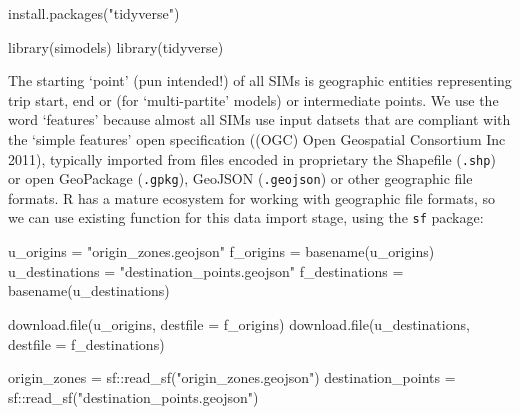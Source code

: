 \documentclass[11pt,letterpaper]{article}
\newenvironment{Shaded}{\begin{snugshade}}{\end{snugshade}}
\newcommand{\AttributeTok}[1]{\textcolor[rgb]{0.77,0.63,0.00}{#1}}
\newcommand{\FunctionTok}[1]{\textcolor[rgb]{0.00,0.00,0.00}{#1}}
\newcommand{\NormalTok}[1]{#1}
\newcommand{\OtherTok}[1]{\textcolor[rgb]{0.56,0.35,0.01}{#1}}
\newcommand{\SpecialCharTok}[1]{\textcolor[rgb]{0.00,0.00,0.00}{#1}}
\newcommand{\StringTok}[1]{\textcolor[rgb]{0.31,0.60,0.02}{#1}}
\begin{document}
\begin{Shaded}
\begin{Highlighting}[]
\FunctionTok{install.packages}\NormalTok{(}\StringTok{"tidyverse"}\NormalTok{)}
\end{Highlighting}
\end{Shaded}

\begin{Shaded}
\begin{Highlighting}[]
\FunctionTok{library}\NormalTok{(simodels)}
\FunctionTok{library}\NormalTok{(tidyverse)}
\end{Highlighting}
\end{Shaded}

The starting `point' (pun intended!) of all SIMs is geographic entities representing trip start, end or (for `multi-partite' models) or intermediate points.
We use the word `features' because almost all SIMs use input datsets that are compliant with the `simple features' open specification ((OGC) Open Geospatial Consortium Inc 2011), typically imported from files encoded in proprietary the Shapefile (\texttt{.shp}) or open GeoPackage (\texttt{.gpkg}), GeoJSON (\texttt{.geojson}) or other geographic file formats.
R has a mature ecosystem for working with geographic file formats, so we can use existing function for this data import stage, using the \texttt{sf} package:

\begin{Shaded}
\begin{Highlighting}[]
\NormalTok{u\_origins }\OtherTok{=} \StringTok{"origin\_zones.geojson"}
\NormalTok{f\_origins }\OtherTok{=} \FunctionTok{basename}\NormalTok{(u\_origins)}
\NormalTok{u\_destinations }\OtherTok{=} \StringTok{"destination\_points.geojson"}
\NormalTok{f\_destinations }\OtherTok{=} \FunctionTok{basename}\NormalTok{(u\_destinations)}
\end{Highlighting}
\end{Shaded}

\begin{Shaded}
\begin{Highlighting}[]
\FunctionTok{download.file}\NormalTok{(u\_origins, }\AttributeTok{destfile =}\NormalTok{ f\_origins)}
\FunctionTok{download.file}\NormalTok{(u\_destinations, }\AttributeTok{destfile =}\NormalTok{ f\_destinations)}
\end{Highlighting}
\end{Shaded}

\begin{Shaded}
\begin{Highlighting}[]
\NormalTok{origin\_zones }\OtherTok{=}\NormalTok{ sf}\SpecialCharTok{::}\FunctionTok{read\_sf}\NormalTok{(}\StringTok{"origin\_zones.geojson"}\NormalTok{)}
\NormalTok{destination\_points }\OtherTok{=}\NormalTok{ sf}\SpecialCharTok{::}\FunctionTok{read\_sf}\NormalTok{(}\StringTok{"destination\_points.geojson"}\NormalTok{)}
\end{Highlighting}
\end{Shaded}
\end{document}
